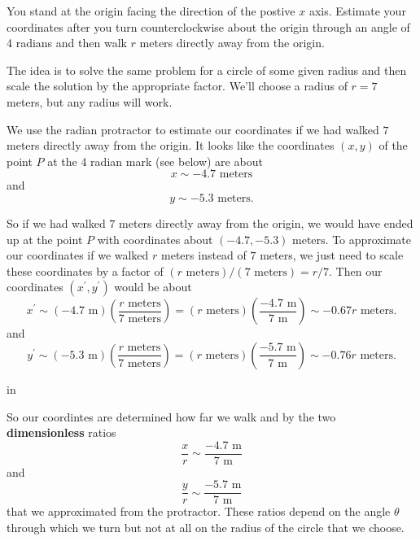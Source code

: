 \documentclass{ximera}
\newcommand{\pskip}{\vskip 0.1 in}
\begin{document}
\begin{question} \label{Q2435r6:Cosine}

You stand at the origin facing the direction of the postive $x$ axis. Estimate your coordinates after you turn counterclockwise about the origin through an angle of 4 radians and then walk $r$ meters directly away from the origin.

\begin{explanation}
The idea is to solve the same problem for a circle of some given radius and then scale the solution by the appropriate factor. We'll choose a radius of $r=7$ meters, but any radius will work.

We use the radian protractor to estimate our coordinates if we had walked $7$ meters directly away from the origin.  It looks like the coordinates $(x,y)$ of the point $P$ at the 4 radian mark (see below) are about 
\[
   x\sim -4.7 \text{ meters}
\]
and 
\[
  y\sim -5.3 \text{ meters}.
\]

So if we had walked $7$ meters directly away from the origin, we would have ended up at the point $P$ with coordinates about $(-4.7, -5.3)\text{ meters}$. To approximate our coordinates if we walked $r$ meters instead of $7$ meters, we just need to scale these coordinates by a factor of $(r\text{ meters})/(7\text{ meters}) = r/7$. Then our coordinates $(x^\prime,y^\prime)$ would be about
\[
   x^\prime \sim (-4.7\text{ m}) \left( \frac{r\text{ meters}}{7\text{ meters}} \right) = (r \text{ meters})\left( \frac{-4.7\text{ m}}{7\text{ m}}\right) \sim  -0.67r   \text{ meters}.
\]
and
\[
   y^\prime   \sim (-5.3\text{ m}) \left( \frac{r\text{ meters}}{7\text{ meters}} \right) = (r \text{ meters})\left( \frac{-5.7\text{ m}}{7\text{ m}}\right) \sim   -0.76 r \text{ meters}.
\]

 
\begin{onlineOnly}
    \begin{center}
\end{center}
\end{onlineOnly}


\pskip

So our coordintes are determined how far we walk and by the two {\bf dimensionless} ratios
\[
    \frac{x}{r} \sim \frac{-4.7\text{ m}}{7\text{ m}}
\] 
and
\[
   \frac{y}{r} \sim \frac{-5.7\text{ m}}{7\text{ m}}
\]
that we approximated from the protractor. These ratios depend on the angle $\theta$ through which we turn but not at all on the radius of the circle that we choose. 


\end{explanation}
\end{question}
\end{document}
